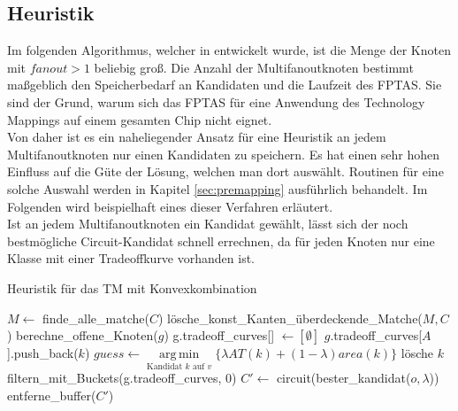 \documentclass[11pt, a4paper, german]{article}
\DeclareMathOperator*{\argmin}{arg\,min}
\begin{document}
\subsection{Heuristik}
\label{subsec:heuristik}
Im folgenden Algorithmus, welcher in \cite{Elbert} entwickelt wurde,  ist die Menge der Knoten mit $fanout > 1$ beliebig groß.
Die Anzahl der Multifanoutknoten bestimmt maßgeblich den Speicherbedarf an Kandidaten und die Laufzeit des FPTAS. Sie sind der Grund, warum sich das FPTAS für eine Anwendung des Technology Mappings auf einem gesamten Chip nicht eignet. \\
Von daher ist es ein naheliegender Ansatz für eine Heuristik an jedem Multifanoutknoten nur einen Kandidaten zu speichern. Es hat einen sehr hohen Einfluss auf die Güte der Lösung, welchen man dort auswählt. Routinen für eine solche Auswahl werden in Kapitel \ref{sec:premapping} ausführlich behandelt. Im Folgenden wird beispielhaft eines dieser Verfahren erläutert. \\
Ist an jedem Multifanoutknoten ein Kandidat gewählt, lässt sich der noch bestmögliche Circuit-Kandidat schnell errechnen, da für jeden Knoten nur eine Klasse mit einer Tradeoffkurve vorhanden ist.\\

\LinesNumbered
\begin{algorithm}[H]
\DontPrintSemicolon
\caption{Heuristik f\"ur das TM mit Konvexkombination}

   $M \gets$ finde\_alle\_matche($C$)\;
   lösche\_konst\_Kanten\_überdeckende\_Matche($M, C$)\;
        {
			berechne\_offene\_Knoten($g$)\;	 
        }
  {
    g.tradeoff\_curves[] $\gets [\emptyset]$\;
    {
      {
        {
        	 {
			$g$.tradeoff\_curves[$A$].push\_back($k$)\;      	 
        	 }  
        }
      }
    }
  {
    $guess \gets \argmin\limits_{\text{Kandidat }k\text{ auf }v}\{ \lambda AT(k) + (1-\lambda) area(k)  \}$\;
    {
      {
	l\"osche $k$\;
      }
    }
  }    
    filtern\_mit\_Buckets(g.tradeoff\_curves, 0)\;    
  }
  $C' \gets $ circuit(bester\_kandidat($o, \lambda$))\;
  \Return entferne\_buffer($C'$)\;
\end{algorithm}\ \\
\end{document}
